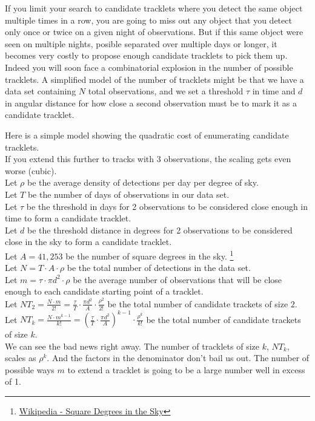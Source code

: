 If you limit your search to candidate tracklets where you detect the same object multiple times in a row,
you are going to miss out any object that you detect only once or twice on a given night of observations.
But if this same object were seen on multiple nights, posible separated over multiple days or longer, 
it becomes very costly to propose enough candidate tracklets to pick them up.
Indeed you will soon face a combinatorial explosion in the number of possible tracklets.
A simplified model of the number of tracklets might be that we have a data set containing $N$ total observations,
and we set a threshold $\tau$ in time and $d$ in angular distance for how close a second observation must be to mark it as a candidate tracklet.

Here is a simple model showing the quadratic cost of enumerating candidate tracklets. \\
If you extend this further to tracks with 3 observations, the scaling gets even worse (cubic).\\
Let $\rho$ be the average density of detections per day per degree of sky.\\
Let $T$ be the number of days of observations in our data set.\\
Let $\tau$ be the threshold in days for 2 observations to be considered close enough in time to form a candidate tracklet.\\
Let $d$ be the threshold distance in degrees for 2 observations to be considered close in the sky to form a candidate tracklet.\\
Let $A = 41,253$ be the number of square degrees in the sky.
\footnote{\href{https://en.wikipedia.org/wiki/Square_degree}{Wikipedia - Square Degrees in the Sky}}\\
Let $N = T \cdot A \cdot \rho $ be the total number of detections in the data set.\\
Let $\displaystyle{m = \tau \cdot \pi d^2 \cdot \rho}$ be the average number of observations that will be close enough
to each candidate starting point of a tracklet.\\
Let $\displaystyle{NT_{2} = \frac{N \cdot m}{2!} = \frac{\tau}{T} \cdot \frac{\pi d^2}{A} \cdot \frac{\rho^{2}}{2!} }$ 
be the total number of candidate trackets of size $2$. \\
Let $\displaystyle{NT_{k} = \frac{N \cdot m^{k-1}}{k!} = \left( \frac{\tau}{T} \cdot \frac{\pi d^2}{A} \right)^{k-1} \cdot \frac{\rho^{k}}{k!} }$ 
be the total number of candidate trackets of size $k$. \\
We can see the bad news right away.
The number of tracklets of size $k$, $NT_{k}$, scales as $\rho^{k}$.
And the factors in the denominator don't bail us out.  
The number of possible ways $m$ to extend a tracklet is going to be a large number well in excess of 1.

